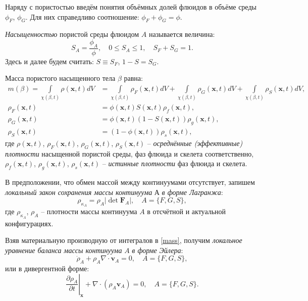 	Наряду с пористостью введём понятия объёмных долей флюидов в объёме среды $\phi_F$, $\phi_G$. Для них справедливо соотношение: $\phi_F + \phi_G = \phi$.
	
	\textit{Насыщенностью} пористой среды флюидом $A$ называется величина:
\begin{equation}
	\label{satur}
	S_A = \frac{\phi_A}{\phi}, \quad 0 \leq S_A \leq 1, \quad S_F + S_G = 1.
\end{equation}
	Здесь и далее будем считать: $S \equiv S_F$, $1-S = S_G$.

	Масса пористого насыщенного тела $\beta$ равна:
\begin{align}
	\label{mass}
	m(\beta) = \int\limits_{\chi(\beta, t)} \rho(\mathbf{x}, t) dV &= 
	\int\limits_{\chi(\beta, t)} \rho_F(\mathbf{x}, t) dV + \int\limits_{\chi(\beta, t)}\rho_G(\mathbf{x}, t)dV + \int\limits_{\chi(\beta, t)}\rho_S(\mathbf{x}, t)dV,\\
	\rho_F(\mathbf{x}, t) &= \phi(\mathbf{x}, t) S(\mathbf{x}, t) \rho_f(\mathbf{x}, t),\\
	\rho_G(\mathbf{x}, t) &= \phi(\mathbf{x}, t)(1-S(\mathbf{x}, t))\rho_g(\mathbf{x}, t),\\
	\rho_S(\mathbf{x}, t) &= (1-\phi(\mathbf{x}, t))\rho_s(\mathbf{x}, t),
\end{align}
	где $\rho(\mathbf{x}, t)$, $\rho_F(\mathbf{x}, t)$, $\rho_G(\mathbf{x}, t)$, $\rho_S(\mathbf{x}, t)$ -- \textit{осреднённые (эффективные) плотности} насыщенной пористой среды, фаз флюида и скелета соответственно,
	$\rho_f(\mathbf{x}, t)$, $\rho_g(\mathbf{x}, t)$, $\rho_s(\mathbf{x}, t)$ -- \textit{истинные плотности} фаз флюида и скелета.

	В предположении, что обмен массой между континуумами отсутствует, запишем \textit{локальный закон сохранения массы континуума} $А$ \textit{в форме Лагранжа}:
\begin{equation}
	\label{mass_law_l}
	\rho_{\kappa_A} = \rho_A \left|\det \mathbf{F}_A\right|, \quad A=\{F, G, S\},
\end{equation}
	где $\rho_{\kappa_A}$, $\rho_A$ -- плотности массы континуума $A$ в отсчётной и актуальной конфигурациях.
	
	Взяв материальную производную от интегралов в \eqref{mass}, получим \textit{локальное уравнение баланса массы континуума} $A$ \textit{в форме Эйлера}:
\begin{equation}
	\label{mass_law_e}
	\dot{\rho}_A + \rho_A \nabla \cdot \mathbf{v}_A = 0, \quad A=\{F, G, S\},
\end{equation}
	или в дивергентной форме:
\begin{equation}
	\label{mass_law_e_div}
	\left.\frac{\partial \rho_A}{\partial t}\right|_{\mathbf{x}} + \nabla \cdot \left(\rho_A \mathbf{v}_A\right) = 0, \quad A=\{F, G, S\}.
\end{equation}
	
